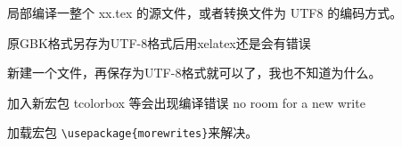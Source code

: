 \begin{list}
 局部编译一整个 xx.tex 的源文件，或者转换文件为 UTF8 的编码方式。


\item
\color{red}
原GBK格式另存为UTF-8格式后用xelatex还是会有错误\\
\normalcolor

 新建一个文件，再保存为UTF-8格式就可以了，我也不知道为什么。

\item
\color{red}
加入新宏包 tcolorbox 等会出现编译错误 no room for a new write\\
\normalcolor

 加载宏包 \verb|\usepackage{morewrites}|来解决。


\end{list}
